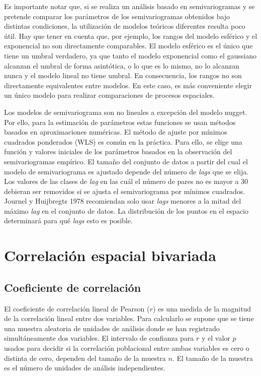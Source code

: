 \documentclass[11pt,b5paper,]{krantz}
\begin{document}
Es importante notar que, si se realiza un análisis basado en semivariogramas y se pretende comparar los parámetros de los semivariogramas obtenidos bajo distintas condiciones, la utilización de modelos teóricos diferentes resulta poco útil. Hay que tener en cuenta que, por ejemplo, los rangos del modelo esférico y el exponencial no son directamente comparables. El modelo esférico es el único que tiene un umbral verdadero, ya que tanto el modelo exponencial como el gaussiano alcanzan el umbral de forma asintótica, o lo que es lo mismo, no lo alcanzan nunca y el modelo lineal no tiene umbral. En consecuencia, los rangos no son directamente equivalentes entre modelos. En este caso, es más conveniente elegir un único modelo para realizar comparaciones de procesos espaciales.

Los modelos de semivariograma son no lineales a excepción del modelo nugget. Por ello, para la estimación de parámetros estas funciones se usan métodos basados en aproximaciones numéricas. El método de ajuste por mínimos cuadrados ponderados (WLS) es común en la práctica. Para ello, se elige una función y valores iniciales de los parámetros basados en la observación del semivariogramas empírico. El tamaño del conjunto de datos a partir del cual el modelo de semivariograma es ajustado depende del número de \emph{lags} que se elija. Los valores de las clases de \emph{lag} en las cuál el número de pares no es mayor a 30 debieran ser removidos si se ajusta el semivariograma por mínimos cuadrados. Journel y Huijbregts 1978 recomiendan solo usar \emph{lags} menores a la mitad del máximo \emph{lag} en el conjunto de datos. La distribución de los puntos en el espacio determinará para qué \emph{lags} esto es posible.

\hypertarget{correlaciuxf3n-espacial-bivariada}{%
\section{Correlación espacial bivariada}\label{correlaciuxf3n-espacial-bivariada}}

\hypertarget{coeficiente-de-correlaciuxf3n}{%
\subsection{Coeficiente de correlación}\label{coeficiente-de-correlaciuxf3n}}

El coeficiente de correlación lineal de Pearson (\(r\)) es una medida de la magnitud de la correlación lineal entre dos variables. Para calcularlo se supone que se tiene una muestra aleatoria de unidades de análisis donde se han registrado simultáneamente dos variables. El intervalo de confianza para \(r\) y el valor \(p\) usados para decidir si la correlación poblacional entre ambas variables es cero o distinta de cero, dependen del tamaño de la muestra \(n\). El tamaño de la muestra es el número de unidades de análisis independientes.
\end{document}
